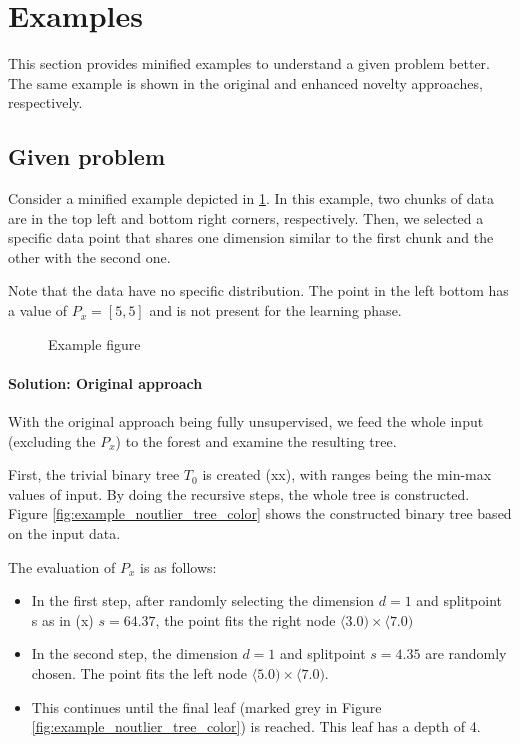 \section{Examples}
\label{sec:examples}

This section provides minified examples to understand a given problem better. The same example is shown in the original and enhanced novelty approaches, respectively.

\subsection{Given problem}

Consider a minified example depicted in \ref{fig:example_data}. In this example, two chunks of data are in the top left and bottom right corners, respectively. Then, we selected a specific data point that shares one dimension similar to the first chunk and the other with the second one.

Note that the data have no specific distribution. The point in the left bottom has a value of $P_x = [5,5]$ and is not present for the learning phase.

\begin{figure}[htbp]
\centering

\caption{Example figure}
\label{fig:example_data}
\end{figure}

\paragraph{Solution: Original approach}
With the original approach being fully unsupervised, we feed the whole input (excluding the $P_x$) to the forest and examine the resulting tree.

First, the trivial binary tree $T_0$ is created (xx), with ranges being the min-max values of input.
By doing the recursive steps, the whole tree is constructed.
Figure \ref{fig:example_noutlier_tree_color} shows the constructed binary tree based on the input data.

The evaluation of $P_x$ is as follows:
\begin{itemize}
    \item In the first step, after randomly selecting the dimension $d=1$ and splitpoint s as in (x) $s = 64.37$, the point fits the right node $\langle 3.0 ) \times \langle 7.0)$
    \item In the second step, the dimension $d=1$ and splitpoint $s = 4.35$ are randomly chosen. The point fits the left node $\langle 5.0 ) \times \langle 7.0)$.
    \item This continues until the final leaf (marked grey in Figure \ref{fig:example_noutlier_tree_color}) is reached. This leaf has a depth of 4.
    
\end{itemize}


